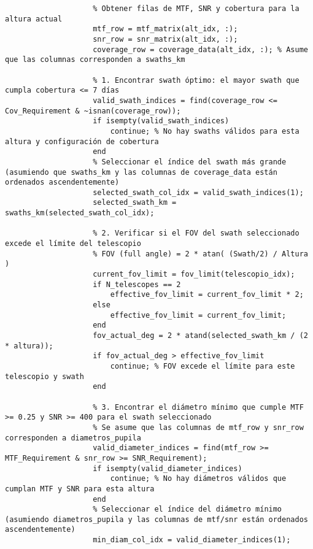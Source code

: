 \begin{verbatim}
                    % Obtener filas de MTF, SNR y cobertura para la altura actual
                    mtf_row = mtf_matrix(alt_idx, :);
                    snr_row = snr_matrix(alt_idx, :);
                    coverage_row = coverage_data(alt_idx, :); % Asume que las columnas corresponden a swaths_km

                    % 1. Encontrar swath óptimo: el mayor swath que cumpla cobertura <= 7 días
                    valid_swath_indices = find(coverage_row <= Cov_Requirement & ~isnan(coverage_row));
                    if isempty(valid_swath_indices)
                        continue; % No hay swaths válidos para esta altura y configuración de cobertura
                    end
                    % Seleccionar el índice del swath más grande (asumiendo que swaths_km y las columnas de coverage_data están ordenados ascendentemente)
                    selected_swath_col_idx = valid_swath_indices(1);
                    selected_swath_km = swaths_km(selected_swath_col_idx);

                    % 2. Verificar si el FOV del swath seleccionado excede el límite del telescopio
                    % FOV (full angle) = 2 * atan( (Swath/2) / Altura )
                    current_fov_limit = fov_limit(telescopio_idx);
                    if N_telescopes == 2
                        effective_fov_limit = current_fov_limit * 2;
                    else
                        effective_fov_limit = current_fov_limit;
                    end
                    fov_actual_deg = 2 * atand(selected_swath_km / (2 * altura));
                    if fov_actual_deg > effective_fov_limit
                        continue; % FOV excede el límite para este telescopio y swath
                    end

                    % 3. Encontrar el diámetro mínimo que cumple MTF >= 0.25 y SNR >= 400 para el swath seleccionado
                    % Se asume que las columnas de mtf_row y snr_row corresponden a diametros_pupila
                    valid_diameter_indices = find(mtf_row >= MTF_Requirement & snr_row >= SNR_Requirement);
                    if isempty(valid_diameter_indices)
                        continue; % No hay diámetros válidos que cumplan MTF y SNR para esta altura
                    end
                    % Seleccionar el índice del diámetro mínimo (asumiendo diametros_pupila y las columnas de mtf/snr están ordenados ascendentemente)
                    min_diam_col_idx = valid_diameter_indices(1);
                    

\end{verbatim}
